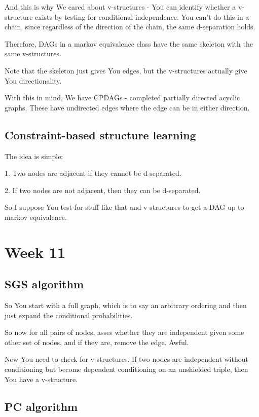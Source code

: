 \documentclass{article}
\begin{document}
		And this is why We cared about v-structures - You can identify whether a v-structure exists by testing for conditional independence. You can't do this in a chain, since regardless of the direction of the chain, the same d-separation holds.
		
		Therefore, DAGs in a markov equivalence class have the same skeleton with the same v-structures.
		
		Note that the skeleton just gives You edges, but the v-structures actually give You directionality.
		
		With this in mind, We have CPDAGs - completed partially directed acyclic graphs. These have undirected edges where the edge can be in either direction.
		
	\subsection{Constraint-based structure learning}
	
		The idea is simple:
		
		1. Two nodes are adjacent if they cannot  be d-separated.
		
		2. If two nodes are not adjacent, then they can be d-separated.
		
		So I suppose You test for stuff like that and v-structures to get a DAG up to markov equivalence.
		
\section{Week 11}

	\subsection{SGS algorithm}
	
		So You start with a full graph, which is to say an arbitrary ordering and then just expand the conditional probabilities.
		
		So now for all pairs of nodes, asses whether they are independent given some other set of nodes, and if they are, remove the edge. Awful.
		
		Now You need to check for v-structures. If two nodes are independent without conditioning but become dependent conditioning on an unshielded triple, then You have a v-structure.
		
	\subsection{PC algorithm}
	
\end{document}
